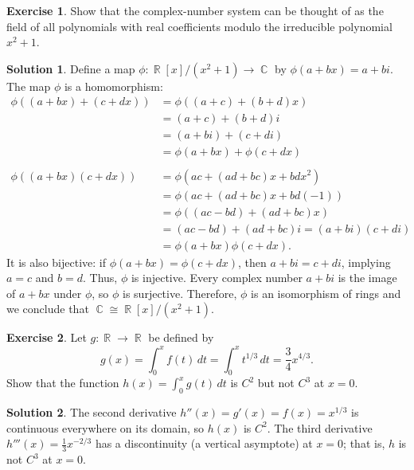 \documentclass{article}
\theoremstyle{definition}
\newtheorem{exercise}{Exercise}
\newtheorem*{solution}{Solution}
\DeclareMathOperator{\R}{\mathbb{R}}
\DeclareMathOperator{\C}{\mathbb{C}}
\begin{document}
\begin{exercise}
    Show that the complex-number system can be thought of as the field of all polynomials with real coefficients modulo the irreducible polynomial \(x^2+1\).
\end{exercise}
\begin{solution}
    Define a map \(\phi:\R[x]/(x^2+1)\to\C\) by \(\phi(a+bx)=a+bi\). The map \(\phi\) is a homomorphism:
    \begin{align*}
        \phi((a+bx)+(c+dx))&=\phi((a+c)+(b+d)x)\\
        &=(a+c)+(b+d)i \\
        &=(a+bi)+(c+di) \\
        &=\phi(a+bx)+\phi(c+dx) \\
        &\\
        \phi((a+bx)(c+dx))&=\phi(ac+(ad+bc)x+bdx^2) \\
        &=\phi(ac+(ad+bc)x+bd(-1)) \\
        &=\phi((ac-bd)+(ad+bc)x) \\
        &=(ac-bd)+(ad+bc)i=(a+bi)(c+di) \\
        &=\phi(a+bx)\phi(c+dx).
    \end{align*}
    It is also bijective: if \(\phi(a+bx)=\phi(c+dx)\), then \(a+bi=c+di\), implying \(a=c\) and \(b=d\). Thus, \(\phi\) is injective. Every complex number \(a+bi\) is the image of \(a+bx\) under \(\phi\), so \(\phi\) is surjective. Therefore, \(\phi\) is an isomorphism of rings and we conclude that \(\C\cong\R[x]/(x^2+1)\).
\end{solution}


\begin{exercise}
    Let \(g:\R\to\R\) be defined by
    \[g(x)=\int_0^x f(t)\,dt=\int_0^x t^{1/3}\,dt=\frac{3}{4}x^{4/3}.\]
    Show that the function \(h(x)=\int_0^x g(t)\,dt\) is \(C^2\) but not \(C^3\) at \(x=0\).
\end{exercise}
\begin{solution}
    The second derivative \(h''(x)=g'(x)=f(x)=x^{1/3}\) is continuous everywhere on its domain, so \(h(x)\) is \(C^2\). The third derivative \(h'''(x)=\frac{1}{3}x^{-2/3}\) has a discontinuity (a vertical asymptote) at \(x=0\); that is, \(h\) is not \(C^3\) at \(x=0\).
\end{solution}
\end{document}
